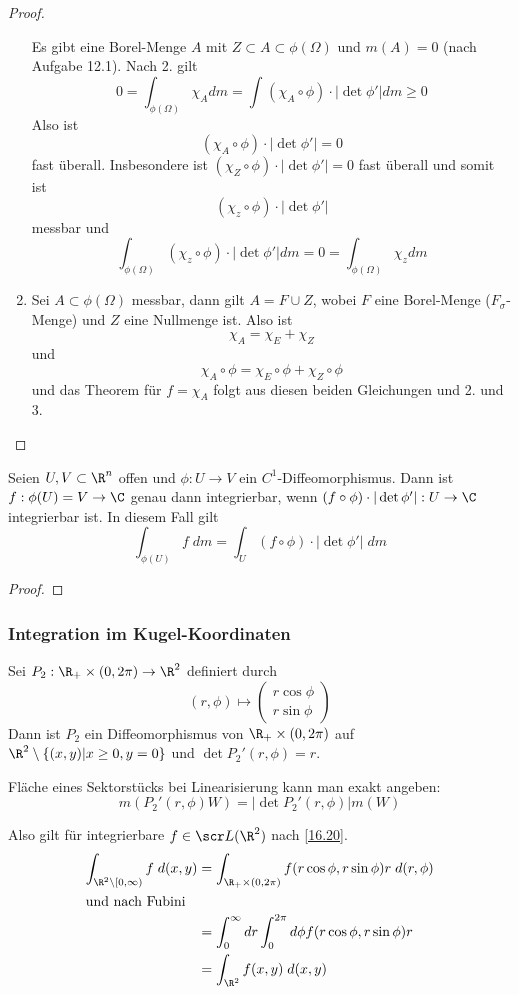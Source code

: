\documentclass[a4paper,10pt]{scrartcl}
\begin{document}
\begin{thm}
\begin{proof}
\begin{enumerate}
				Es gibt eine Borel-Menge $A$ mit $Z\subset A \subset \phi(\Omega)$ und $m(A)=0$ (nach Aufgabe 12.1).
				Nach 2. gilt
				\[
					0 = \int_{\phi(\Omega)} \chi_A dm = \int_{}(\chi_A \circ \phi) \cdot |\det \phi'| dm \ge 0
				\]
				Also ist
				\[
					(\chi_A \circ \phi)\cdot |\det \phi'| = 0
				\]
				fast überall.
				Insbesondere ist $(\chi_Z\circ \phi)\cdot |\det \phi'|=0$ fast überall und somit ist
				\[
					(\chi_z \circ \phi)\cdot |\det \phi'|
				\]
				messbar und
				\[
					\int_{\phi(\Omega)} (\chi_z \circ \phi)\cdot |\det \phi'| dm = 0 = \int_{\phi(\Omega)} \chi_z dm
				\]
			\item
				Sei $A\subset \phi(\Omega)$ messbar, dann gilt $A = F\cup Z$, wobei $F$ eine Borel-Menge ($F_\sigma$-Menge) und $Z$ eine Nullmenge ist.
				Also ist
				\[
					\chi_A = \chi_E + \chi_Z
				\]
				und
				\[
					\chi_A \circ \phi = \chi_E \circ \phi + \chi_Z \circ \phi
				\]
				und das Theorem für $f=\chi_A$ folgt aus diesen beiden Gleichungen und 2. und 3.
		\end{enumerate}
	\end{proof}
\end{thm}

\begin{kor}
	\label{16.20}
	Seien $U,V\subset \R^n$ offen und $\phi:U\to V$ ein $C^1$-Diffeomorphismus.
	Dann ist $f:\phi(U)=V \to \C$  genau dann integrierbar, wenn $(f\circ \phi)\cdot |\det \phi'| : U\to \C$ integrierbar ist.
	In diesem Fall gilt
	\[
		\int_{\phi(U)}f\;dm = \int_U (f\circ \phi)\cdot |\det \phi'| \; dm
	\]
	\begin{proof}
		\fixme[Übung]
	\end{proof}
\end{kor}


\subsubsection{Integration im Kugel-Koordinaten}

Sei $P_2 : \R_+ \times (0,2\pi)\to \R^2$ definiert durch
\[
	(r,\phi) \mapsto \begin{pmatrix}r\cos \phi\\ r\sin \phi\end{pmatrix}
\]
Dann ist $P_2$ ein Diffeomorphismus von $\R_+ \times (0,2\pi)$ auf $\R^2 \setminus \{(x,y) | x\ge 0, y= 0\}$ und
$\det P_2'(r,\phi) = r$.
\begin{note}
	Fläche eines Sektorstücks bei Linearisierung kann man exakt angeben:
	\[
		m(P_2'(r,\phi)W) = |\det P_2'(r,\phi)|m(W)
	\]
\end{note}
Also gilt für integrierbare $f\in \scr L(\R^2)$ nach \ref{16.20}.
\begin{align*}
	\int_{\R^2\setminus [0,\infty)}f\;d(x,y) &= \int_{\R_+\times (0,2\pi)}f(r\cos \phi, r\sin \phi) r \; d(r,\phi)\\
	\intertext{und nach Fubini}
	&= \int_0^\infty dr \int_0^{2\pi}d\phi f(r\cos \phi,r\sin \phi) r\\
	&= \int_{\R^2} f(x,y) \; d(x,y)
\end{align*}
\end{document}
